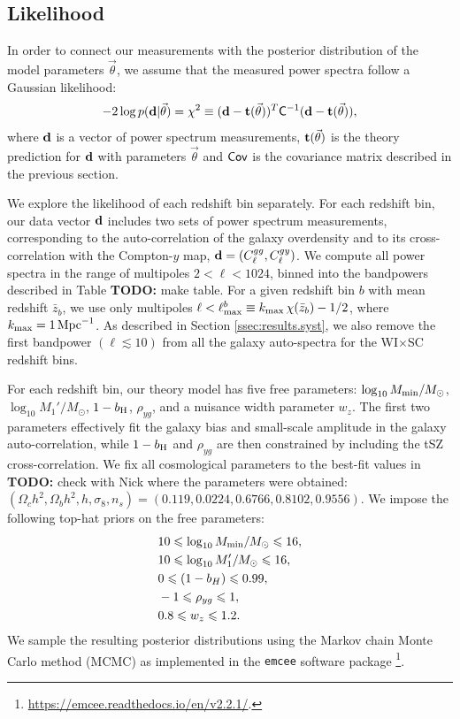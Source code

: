 \documentclass[useAMS,usenatbib]{mn2e}
\newcommand{\TODO}[1]{{\bf TODO:} #1}
\begin{document}
  \subsection{Likelihood}\label{ssec:methods.like}
    In order to connect our measurements with the posterior distribution of the model parameters $\vec{\theta}$, we assume that the measured power spectra follow a Gaussian likelihood:
    \begin{equation}
      -2\log p({\bf d}|\vec{\theta}) = \chi^2\equiv ({\bf d}-{\bf t}(\vec{\theta}))^T {\sf C}^{-1} ({\bf d}-{\bf t}(\vec{\theta})),
    \end{equation}
    where ${\bf d}$ is a vector of power spectrum measurements, ${\bf t}(\vec{\theta})$ is the theory prediction for ${\bf d}$ with parameters $\vec{\theta}$ and ${\sf Cov}$ is the covariance matrix described in the previous section.

    We explore the likelihood of each redshift bin separately. For each redshift bin, our data vector ${\bf d}$ includes two sets of power spectrum measurements, corresponding to the auto-correlation of the galaxy overdensity and to its cross-correlation with the Compton-$y$ map, ${\bf d}=(C^{gg}_\ell,C^{gy}_\ell)$. We compute all power spectra in the range of multipoles $2<\ell<1024$, binned into the bandpowers described in Table \TODO{make table}. For a given redshift bin $b$ with mean redshift $\bar{z}_b$, we use only multipoles $\ell<\ell^b_{\rm max}\equiv k_{\rm max}\,\chi(\bar{z}_b)-1/2$, where $k_{\rm max}=1\,{\rm Mpc}^{-1}$. As described in Section \ref{ssec:results.syst}, we also remove the first bandpower $(\ell\lesssim10)$ from all the galaxy auto-spectra for the WI$\times$SC redshift bins.

    For each redshift bin, our theory model has five free parameters: $\log_{10}M_{\rm min}/M_\odot$, $\log_{10}M_1'/M_\odot$, $1-b_{\rm H}$, $\rho_{yg}$, and a nuisance width parameter $w_z$. The first two parameters effectively fit the galaxy bias and small-scale amplitude in the galaxy auto-correlation, while $1-b_{\rm H}$ and $\rho_{yg}$ are then constrained by including the tSZ cross-correlation. We fix all cosmological parameters to the best-fit values in \TODO{check with Nick where the parameters were obtained}: $(\Omega_c h^2,\Omega_bh^2,h,\sigma_8,n_s)=(0.119,0.0224,0.6766,0.8102,0.9556)$. We impose the following top-hat priors on the free parameters:
    \begin{align}
      &10\le\log_{10}M_{\rm min}/M_\odot\le16,\\
      &10\le\log_{10}M_1'/M_\odot\le16,\\
      &0\le(1-b_H)\le0.99,\\
      &-1\le\rho_{yg}\le1,\\
      &0.8\le w_z\le1.2.
    \end{align}
    We sample the resulting posterior distributions using the Markov chain Monte Carlo method (MCMC) as implemented in the {\tt emcee} software package \citep{2013PASP..125..306F}\footnote{\url{https://emcee.readthedocs.io/en/v2.2.1/}.}.
\end{document}
